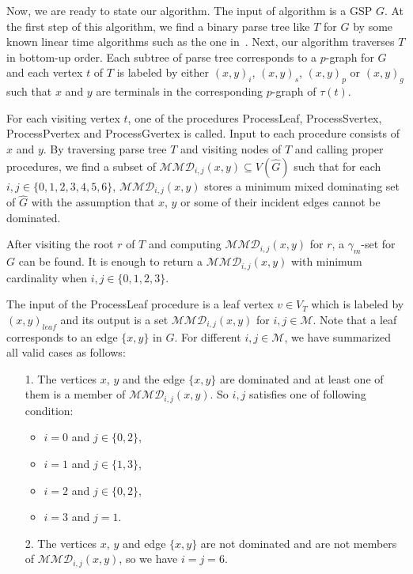 \documentclass[12pt]{article}
\theoremstyle{definition}
\theoremstyle{remark}
\renewcommand\labelitemii{$\bullet$}
\begin{document}
Now, we are ready to state our algorithm. The input of algorithm is a GSP  $G$. At
the first step of this algorithm, we find  a binary  parse tree like $T$ for $G$ by
some known linear time algorithms such as the one in~\cite{hopcroft1973dividing}. Next, our  algorithm traverses $T$ in bottom-up order.
Each subtree of parse tree  corresponds to a $p$-graph for $G$ and each vertex $t$ of $T$ is labeled by either $(x,y)_{i}$, $(x,y)_s$, $(x,y)_p$ or $(x,y)_g$ such that $x$ and $y$ are terminals in the corresponding $p$-graph of $\tau(t)$.
 
 For each visiting vertex $t$, one of the procedures ProcessLeaf, ProcessSvertex,
ProcessPvertex and ProcessGvertex is called. Input to each procedure consists of $x$ and $y$. 
 By traversing parse tree $T$ and visiting nodes of $T$ and calling proper procedures,
we find a subset of $\mathcal{MMD}_{i,j}(x,y)\subseteq V(\hat{G})$ such that for each
$i,j \in \{0,1,2,3,4,5,6\}$, $\mathcal{MMD}_{i,j}(x,y)$ stores a minimum mixed
dominating set of $\hat{G}$ with the assumption that $x$, $y$ or some of their incident edges cannot be dominated. 
 
 After visiting the root $r$ of $T$ and computing $\mathcal{MMD}_{i,j}(x,y)$ for $r$, a $\gamma_m$-set for $G$ can be found.
  It is enough to return a $\mathcal{MMD}_{i,j}(x,y)$ with minimum cardinality when {$i,j\in \{0,1,2,3\}$}.


The input of the ProcessLeaf procedure is a leaf vertex $v \in V_T$ which is labeled by $ (x,y)_{leaf}$ and its output is a set  $\mathcal{MMD}_{i,j}(x,y)$ for $i,j \in \mathcal{M}$. Note that a leaf corresponds  to an edge $\{x,y\}$ in $G$. 
For different $i,j\in \mathcal{M}$, we have summarized all valid cases as follows:


\begin{itemize}
	\item[1.]
	The vertices $x$, $y$ and the edge $\{x,y\}$ are dominated and at least one of them is a member of $\mathcal{MMD}_{i,j}(x,y)$.  So  $i,j$ satisfies one of following condition:
	\let\labelitemi\labelitemii
	\begin{itemize}
		\item 		$i=0$ and $j\in \{0,2\}$,
		\item
		 $i=1$ and $j\in\{1,3\}$,
		 \item
		  $i=2$ and $j\in \{0,2\}$,
		   \item
		   $i=3$ and $ j=1$.
	\end{itemize} 
	\item[2.]
The vertices $x$, $y$ and edge  $\{x,y\}$ are not dominated and  are not  members of $\mathcal{MMD}_{i,j}(x,y)$,  so we have  $i=j=6$.

	\end{itemize} 
\end{document}
